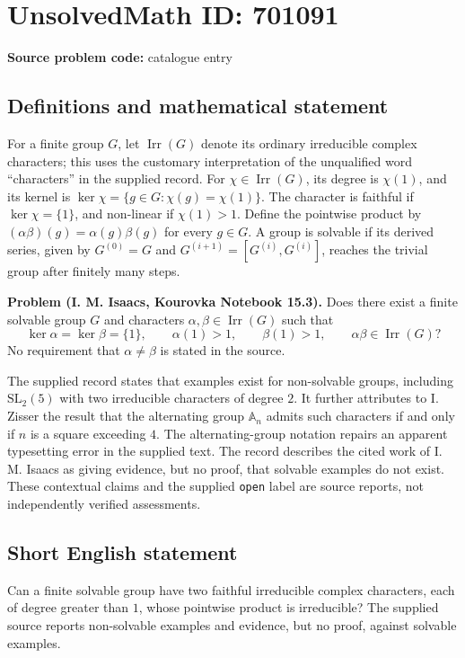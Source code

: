 \documentclass[11pt]{article}
\begin{document}
\section*{UnsolvedMath ID: 701091}
\textbf{Source problem code:} catalogue entry
\subsection{Definitions and mathematical statement}
For a finite group \(G\), let \(\operatorname{Irr}(G)\) denote its ordinary irreducible complex characters; this uses the customary interpretation of the unqualified word ``characters'' in the supplied record. For \(\chi\in\operatorname{Irr}(G)\), its degree is \(\chi(1)\), and its kernel is \(\ker\chi=\{g\in G:\chi(g)=\chi(1)\}\). The character is faithful if \(\ker\chi=\{1\}\), and non-linear if \(\chi(1)>1\). Define the pointwise product by \((\alpha\beta)(g)=\alpha(g)\beta(g)\) for every \(g\in G\). A group is solvable if its derived series, given by \(G^{(0)}=G\) and \(G^{(i+1)}=[G^{(i)},G^{(i)}]\), reaches the trivial group after finitely many steps.

\textbf{Problem (I. M. Isaacs, Kourovka Notebook 15.3).} Does there exist a finite solvable group \(G\) and characters \(\alpha,\beta\in\operatorname{Irr}(G)\) such that
\[
\ker\alpha=\ker\beta=\{1\},\qquad \alpha(1)>1,\qquad \beta(1)>1,\qquad \alpha\beta\in\operatorname{Irr}(G)?
\]
No requirement that \(\alpha\ne\beta\) is stated in the source.

The supplied record states that examples exist for non-solvable groups, including \(\mathrm{SL}_2(5)\) with two irreducible characters of degree \(2\). It further attributes to I. Zisser the result that the alternating group \(\mathbb{A}_n\) admits such characters if and only if \(n\) is a square exceeding \(4\). The alternating-group notation repairs an apparent typesetting error in the supplied text. The record describes the cited work of I. M. Isaacs as giving evidence, but no proof, that solvable examples do not exist. These contextual claims and the supplied \texttt{open} label are source reports, not independently verified assessments.
\subsection{Short English statement}
Can a finite solvable group have two faithful irreducible complex characters, each of degree greater than \(1\), whose pointwise product is irreducible? The supplied source reports non-solvable examples and evidence, but no proof, against solvable examples.
\end{document}
